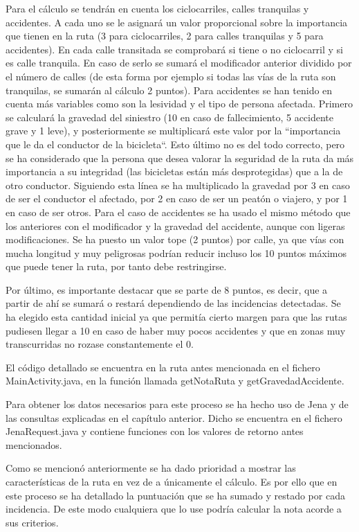 Para el cálculo se tendrán en cuenta los ciclocarriles, calles tranquilas y accidentes. A cada uno se le asignará un valor proporcional sobre la importancia que tienen en la ruta (3 para ciclocarriles, 2 para calles tranquilas y 5 para accidentes). En cada calle transitada se comprobará si tiene o no ciclocarril y si es calle tranquila. En caso de serlo se sumará el modificador anterior dividido por el número de calles (de esta forma por ejemplo si todas las vías de la ruta son tranquilas, se sumarán al cálculo 2 puntos).
Para accidentes se han tenido en cuenta más variables como son la lesividad y el tipo de persona afectada. Primero se calculará la gravedad del siniestro (10 en caso de fallecimiento, 5 accidente grave y 1 leve), y posteriormente se multiplicará este valor por la ``importancia que le da el conductor de la bicicleta``. Esto último no es del todo correcto, pero se ha considerado que la persona que desea valorar la seguridad de la ruta da más importancia a su integridad (las bicicletas están más desprotegidas) que a la de otro conductor. Siguiendo esta línea se ha multiplicado la gravedad por 3 en caso de ser el conductor el afectado, por 2 en caso de ser un peatón o viajero, y por 1 en caso de ser otros.
Para el caso de accidentes se ha usado el mismo método que los anteriores con el modificador y la gravedad del accidente, aunque con ligeras modificaciones. Se ha puesto un valor tope (2 puntos) por calle, ya que vías con mucha longitud y muy peligrosas podrían reducir incluso los 10 puntos máximos que puede tener la ruta, por tanto debe restringirse.

Por último, es importante destacar que se parte de 8 puntos, es decir, que a partir de ahí se sumará o restará dependiendo de las incidencias detectadas. Se ha elegido esta cantidad inicial ya que permitía cierto margen para que las rutas pudiesen llegar a 10 en caso de haber muy pocos accidentes y que en zonas muy transcurridas no rozase constantemente el 0.

El código detallado se encuentra en la ruta antes mencionada en el fichero MainActivity.java, en la función llamada getNotaRuta y getGravedadAccidente.

Para obtener los datos necesarios para este proceso se ha hecho uso de Jena y de las consultas explicadas en el capítulo anterior. Dicho se encuentra en el fichero JenaRequest.java y contiene funciones con los valores de retorno antes mencionados.

Como se mencionó anteriormente se ha dado prioridad a mostrar las características de la ruta en vez de a únicamente el cálculo. Es por ello que en este proceso se ha detallado la puntuación que se ha sumado y restado por cada incidencia. De este modo cualquiera que lo use podría calcular la nota acorde a sus criterios.


